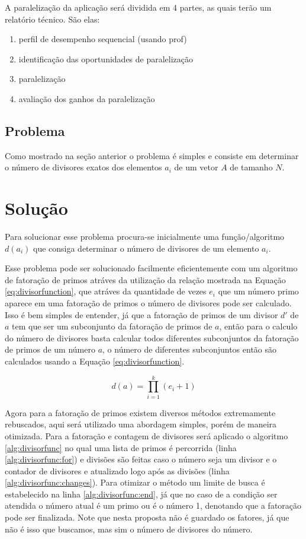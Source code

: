 \documentclass{article}
\begin{document}
A paralelização da aplicação será dividida em 4 partes, as quais terão um relatório técnico. São elas:
\begin{enumerate}
	\item perfil de desempenho sequencial (usando prof)
	\item identificação das oportunidades de paralelização
	\item paralelização
	\item avaliação dos ganhos da paralelização
\end{enumerate}

\subsection{Problema}

Como mostrado na seção anterior o
problema é simples e consiste em determinar o número de divisores exatos dos elementos $a_i$ de um vetor $A$ de tamanho $N$.

\section{Solução}

Para solucionar esse problema procura-se inicialmente uma função/algoritmo $d(a_i)$ que consiga determinar o número de divisores de um elemento $a_i$.

Esse problema pode ser solucionado facilmente eficientemente com um algoritmo de fatoração de primos atráves da utilização da relação mostrada na Equação \ref{eq:divisorfunction}, que atráves da quantidade de vezes $e_i$ que um número primo aparece em uma fatoração de primos o número de divisores pode ser calculado. Isso é bem simples de entender, já que a fatoração de primos de um divisor $d'$ de $a$ tem que ser um subconjunto da fatoração de primos de $a$, então para o calculo do número de divisores basta calcular todos diferentes subconjuntos da fatoração de primos de um número $a$, o número de diferentes subconjuntos então são calculados usando a Equação \ref{eq:divisorfunction}.

\begin{equation}\label{eq:divisorfunction}
	d(a)=\prod_{i=1}^{k} (e_i+1)
\end{equation}

Agora para a fatoração de primos existem diversos métodos extremamente rebuscados, aqui será utilizado uma abordagem simples, porém de maneira otimizada. Para a fatoração e contagem de divisores será aplicado o algoritmo \ref{alg:divisorfunc} no qual uma lista de primos é percorrida (linha \ref{alg:divisorfunc:for}) e divisões são feitas caso o número seja um divisor e o contador de divisores e atualizado logo após as divisões (linha \ref{alg:divisorfunc:changes}). Para otimizar o método um limite de busca é estabelecido na linha \ref{alg:divisorfunc:end}, já que no caso de a condição ser atendida o número atual é um primo ou é o número 1, denotando que a fatoração pode ser finalizada. Note que nesta proposta não é guardado os fatores, já que não é isso que buscamos, mas sim o número de divisores do número.
\end{document}
